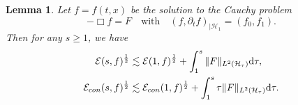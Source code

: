 \documentclass[10pt,a4paper]{amsart}
\newtheorem{lemma}{Lemma}
\def \pt{\partial_{t}}
\begin{document}
 \begin{lemma}\label{le:energy}
 Let $f=f(t,x)$ be the solution to the Cauchy problem
 \begin{equation*}
     -\Box f=F\quad \mbox{with}\quad (f,\pt f)_{|\mathcal{H}_{1}}=(f_{0},f_{1}).
     \end{equation*}
 Then for any $s\geq 1$, we have 
 \begin{equation*}
 \begin{aligned}
     \mathcal{E}(s,f)^{\frac{1}{2}} &\lesssim
     \mathcal{E}(1,f)^{\frac{1}{2}}+\int_{1}^{s}\|F\|_{L^{2}(\mathcal{H}_{\tau})}\mathrm{d} \tau,\\
     \mathcal{E}_{\rm{con}}(s,f)^{\frac{1}{2}} &\lesssim
     \mathcal{E}_{\rm{con}}(1,f)^{\frac{1}{2}}+\int_{1}^{s}\tau\|F\|_{L^{2}(\mathcal{H}_{\tau})}\mathrm{d} \tau.
     \end{aligned}
 \end{equation*}
     \end{lemma}
\end{document}
